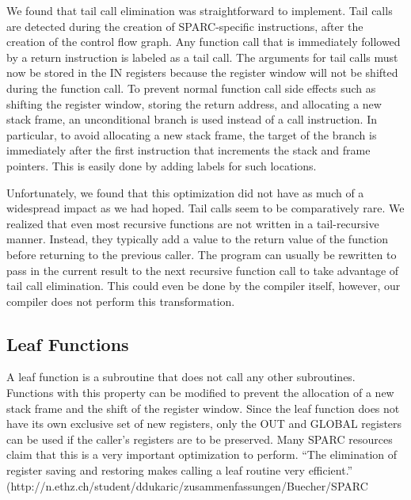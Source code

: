 \documentclass[12pt]{article}
\begin{document}
\begin{multicols}{2}
We found that tail call elimination was straightforward to implement.
Tail calls are detected during the creation of SPARC-specific instructions, after the creation of the control flow graph.
Any function call that is immediately followed by a return instruction is labeled as a tail call.
The arguments for tail calls must now be stored in the IN registers because the register window will not be shifted during the function call.
To prevent normal function call side effects such as shifting the register window, storing the return address, and allocating a new stack frame, an unconditional branch is used instead of a call instruction.
In particular, to avoid allocating a new stack frame, the target of the branch is immediately after the first instruction that increments the stack and frame pointers.
This is easily done by adding labels for such locations.

Unfortunately, we found that this optimization did not have as much of a widespread impact as we had hoped.
Tail calls seem to be comparatively rare.
We realized that even most recursive functions are not written in a tail-recursive manner.
Instead, they typically add a value to the return value of the function before returning to the previous caller.
The program can usually be rewritten to pass in the current result to the next recursive function call to take advantage of tail call elimination.
This could even be done by the compiler itself, however, our compiler does not perform this transformation.

\subsection{Leaf Functions}
A leaf function is a subroutine that does not call any other subroutines.
Functions with this property can be modified to prevent the allocation of a new stack frame and the shift of the register window.
Since the leaf function does not have its own exclusive set of new registers, only the OUT and GLOBAL registers can be used if the caller’s registers are to be preserved.
Many SPARC resources claim that this is a very important optimization to perform.
“The elimination of register saving and restoring makes calling a leaf routine very efficient.” (http://n.ethz.ch/student/ddukaric/zusammenfassungen/Buecher/SPARC%


\end{multicols}
\end{document}
